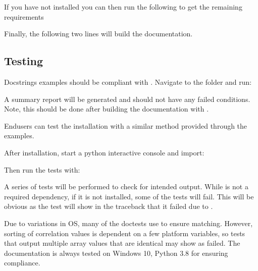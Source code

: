 \documentclass[letterpaper,10pt,english]{sphinxmanual}
\begin{document}
\sphinxAtStartPar
If you have not installed  you can then run the following to get the remaining requirements

\sphinxAtStartPar
{}

\sphinxAtStartPar
Finally, the following two lines will build the documentation.

\sphinxAtStartPar
{}

\sphinxAtStartPar
{}


\subsection{Testing}
\label{\detokenize{install:testing}}
\sphinxAtStartPar
Docstrings examples should be compliant with .
Navigate to the  folder and run:

\sphinxAtStartPar
{}

\sphinxAtStartPar
A summary report will be generated and should not have any failed conditions.
Note, this should be done after building the documentation with .

\sphinxAtStartPar
End\sphinxhyphen{}users can test the installation with a similar method provided through the
examples.

\sphinxAtStartPar
After installation, start a python interactive console and import:

\sphinxAtStartPar
{}

\sphinxAtStartPar
Then run the tests with:

\sphinxAtStartPar
{}

\sphinxAtStartPar
A series of tests will be performed to check for intended output.
While  is not a required dependency, if it is not installed, some
of the tests will fail. This will be obvious as the test will show in the
traceback that it failed due to .

\sphinxAtStartPar
Due to variations in OS, many of the doctests use  to ensure matching.
However, sorting of correlation values is dependent on a few platform variables,
so tests that output multiple array values that are identical may show as failed.
The documentation is always tested on Windows 10, Python 3.8 for ensuring compliance.
\end{document}
